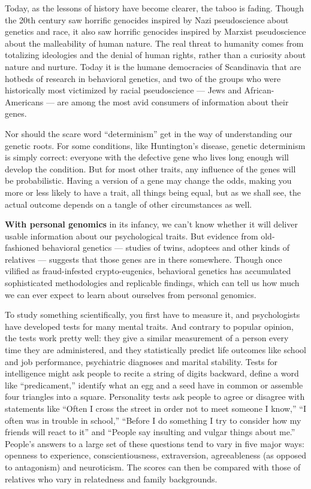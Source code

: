 Today, as the lessons of history have become clearer, the taboo is
fading. Though the 20th century saw horrific genocides inspired by Nazi
pseudoscience about genetics and race, it also saw horrific genocides
inspired by Marxist pseudoscience about the malleability of human
nature. The real threat to humanity comes from totalizing ideologies and
the denial of human rights, rather than a curiosity about nature and
nurture. Today it is the humane democracies of Scandinavia that are
hotbeds of research in behavioral genetics, and two of the groups who
were historically most victimized by racial pseudoscience --- Jews and
African-Americans --- are among the most avid consumers of information
about their genes.

Nor should the scare word ``determinism'' get in the way of
understanding our genetic roots. For some conditions, like Huntington's
disease, genetic determinism is simply correct: everyone with the
defective gene who lives long enough will develop the condition. But for
most other traits, any influence of the genes will be probabilistic.
Having a version of a gene may change the odds, making you more or less
likely to have a trait, all things being equal, but as we shall see, the
actual outcome depends on a tangle of other circumstances as well.

\textbf{With personal genomics} in its infancy, we can't know whether it
will deliver usable information about our psychological traits. But
evidence from old-fashioned behavioral genetics --- studies of twins,
adoptees and other kinds of relatives --- suggests that those genes are
in there somewhere. Though once vilified as fraud-infested
crypto-eugenics, behavioral genetics has accumulated sophisticated
methodologies and replicable findings, which can tell us how much we can
ever expect to learn about ourselves from personal genomics.

To study something scientifically, you first have to measure it, and
psychologists have developed tests for many mental traits. And contrary
to popular opinion, the tests work pretty well: they give a similar
measurement of a person every time they are administered, and they
statistically predict life outcomes like school and job performance,
psychiatric diagnoses and marital stability. Tests for intelligence
might ask people to recite a string of digits backward, define a word
like ``predicament,'' identify what an egg and a seed have in common or
assemble four triangles into a square. Personality tests ask people to
agree or disagree with statements like ``Often I cross the street in
order not to meet someone I know,'' ``I often was in trouble in
school,'' ``Before I do something I try to consider how my friends will
react to it'' and ``People say insulting and vulgar things about me.''
People's answers to a large set of these questions tend to vary in five
major ways: openness to experience, conscientiousness, extraversion,
agreeableness (as opposed to antagonism) and neuroticism. The scores can
then be compared with those of relatives who vary in relatedness and
family backgrounds.

